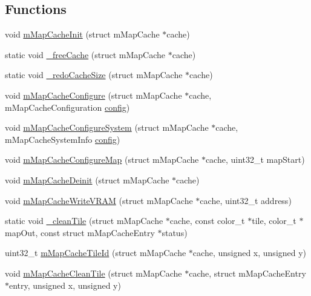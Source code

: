\subsection*{Functions}
\begin{DoxyCompactItemize}
\item 
void \mbox{\hyperlink{map-cache_8c_a29d009ada615c07ef3ad61a09b0e2625}{m\+Map\+Cache\+Init}} (struct m\+Map\+Cache $\ast$cache)
\item 
static void \mbox{\hyperlink{map-cache_8c_a5409e1d298b34a1384ad3b76fab685c5}{\+\_\+free\+Cache}} (struct m\+Map\+Cache $\ast$cache)
\item 
static void \mbox{\hyperlink{map-cache_8c_ab08e2be4f74e6da3a5ec9ef9e0c5a040}{\+\_\+redo\+Cache\+Size}} (struct m\+Map\+Cache $\ast$cache)
\item 
void \mbox{\hyperlink{map-cache_8c_a5d5ff55807cf89a961eaae6c599191ea}{m\+Map\+Cache\+Configure}} (struct m\+Map\+Cache $\ast$cache, m\+Map\+Cache\+Configuration \mbox{\hyperlink{deflate_8c_a4473b5227787415097004fd39f55185e}{config}})
\item 
void \mbox{\hyperlink{map-cache_8c_a4da999fdbbac1c998ca0e5299d56db70}{m\+Map\+Cache\+Configure\+System}} (struct m\+Map\+Cache $\ast$cache, m\+Map\+Cache\+System\+Info \mbox{\hyperlink{deflate_8c_a4473b5227787415097004fd39f55185e}{config}})
\item 
void \mbox{\hyperlink{map-cache_8c_ac10e008271c7b3928897ab928d542cc5}{m\+Map\+Cache\+Configure\+Map}} (struct m\+Map\+Cache $\ast$cache, uint32\+\_\+t map\+Start)
\item 
void \mbox{\hyperlink{map-cache_8c_a5d53da29354cc88338a70840e6c60971}{m\+Map\+Cache\+Deinit}} (struct m\+Map\+Cache $\ast$cache)
\item 
void \mbox{\hyperlink{map-cache_8c_af15ad9aac58ad3f592a48581be0f1f29}{m\+Map\+Cache\+Write\+V\+R\+AM}} (struct m\+Map\+Cache $\ast$cache, uint32\+\_\+t address)
\item 
static void \mbox{\hyperlink{map-cache_8c_ae4693b20d148d7eaa2403672db789c01}{\+\_\+clean\+Tile}} (struct m\+Map\+Cache $\ast$cache, const color\+\_\+t $\ast$tile, color\+\_\+t $\ast$map\+Out, const struct m\+Map\+Cache\+Entry $\ast$status)
\item 
uint32\+\_\+t \mbox{\hyperlink{map-cache_8c_a330e8e4a849ed5b322b16c1fbea42b3f}{m\+Map\+Cache\+Tile\+Id}} (struct m\+Map\+Cache $\ast$cache, unsigned x, unsigned y)
\item 
void \mbox{\hyperlink{map-cache_8c_abccd8ab5a0dafd34ed2be822edc14af6}{m\+Map\+Cache\+Clean\+Tile}} (struct m\+Map\+Cache $\ast$cache, struct m\+Map\+Cache\+Entry $\ast$entry, unsigned x, unsigned y)

\end{DoxyCompactItemize}
